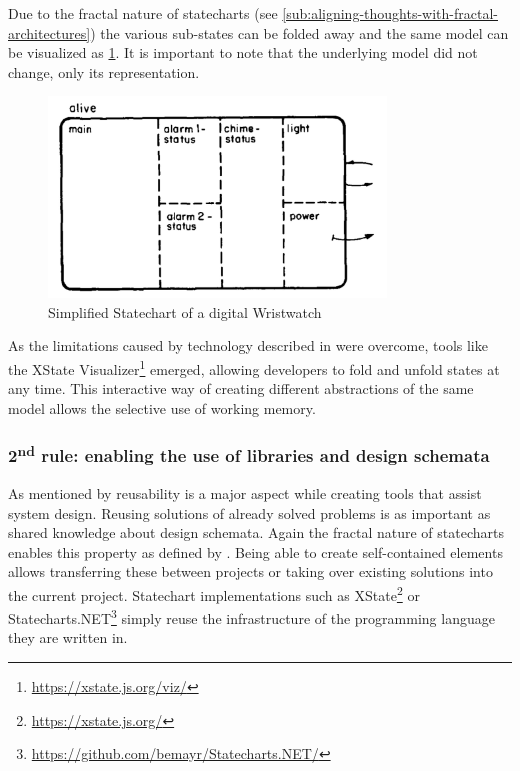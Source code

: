 Due to the fractal nature of statecharts (see \cref{sub:aligning-thoughts-with-fractal-architectures}) the various sub-states can be folded away and the same model can be visualized as \cref{fig:simplified-wristwatch-statechart}.
It is important to note that the underlying model did not change, only its representation.
\begin{figure}[h]
\centering
\includegraphics[width=0.8\textwidth]{images/abstract-watch-statechart}
\caption{Simplified Statechart of a digital Wristwatch}
\label{fig:simplified-wristwatch-statechart}
\end{figure}
As the limitations caused by technology described in \textcite{harel_statecharts:_1987} were overcome, tools like the XState Visualizer\footnote{\url{https://xstate.js.org/viz/}} emerged, allowing developers to fold and unfold states at any time.
This interactive way of creating different abstractions of the same model allows the selective use of working memory.

\subsubsection{2\textsuperscript{nd} rule: enabling the use of libraries and design schemata}
As mentioned by \textcite{visser_expert_1990} reusability is a major aspect while creating tools that assist system design.
Reusing solutions of already solved problems is as important as shared knowledge about design schemata.
Again the fractal nature of statecharts enables this property as defined by \citeauthor{visser_expert_1990}.
Being able to create self-contained elements allows transferring these between projects or taking over existing solutions into the current project.
Statechart implementations such as XState\footnote{\url{https://xstate.js.org/}} or Statecharts.NET\footnote{\url{https://github.com/bemayr/Statecharts.NET/}} simply reuse the infrastructure of the programming language they are written in.

